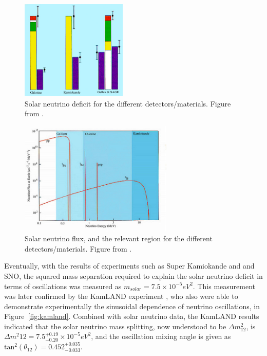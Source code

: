 \begin{figure}[htbp]
  \centering
  \includegraphics[width=0.45\textwidth]{intro_figures/solar_neutrino_deficit.png}
  \caption[Solar Neutrino Deficit]{Solar neutrino deficit for the different detectors/materials.  Figure from \cite{solar_neutrino_image}.}
  \label{fig:solar_neutrino_deficit}
\end{figure}

\begin{figure}[htbp]
  \centering
  \includegraphics[width=0.65\textwidth]{intro_figures/solar_neutrino_flux.png}
  \caption[Solar Neutrino Flux]{Solar neutrino flux, and the relevant region for the different detectors/materials.  Figure from \cite{solar_neutrino_image}.}
  \label{fig:solar_neutrino_flux}
\end{figure}

Eventually, with the results of experiments such as Super Kamiokande and and SNO, the squared mass separation required to explain the solar neutrino deficit in terms of oscillations was measured as $m_{solar} = 7.5 \times 10^{-5} eV^2$.  This measurement was later confirmed by the KamLAND experiment \cite{Eguchi:2002dm, Araki:2004mb}, who also were able to demonstrate experimentally the sinusoidal dependence of neutrino oscillations, in Figure~\ref{fig:kamland}.  Combined with solar neutrino data, the KamLAND results \cite{Abe:2008aa,Gando:2010aa} indicated that the solar neutrino mass splitting, now understood to be $\Delta m^2_{12}$, is $\Delta m^2{12} = 7.5^{+0.19}_{-0.20} \times 10^{-5} eV^2$, and the oscillation mixing angle is given as $\text{tan}^2(\theta_{12}) = 0.452^{+0.035}_{-0.033}$.

